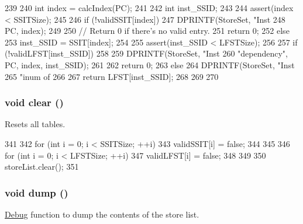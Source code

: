 \begin{DoxyCode}
239 {
240     int index = calcIndex(PC);
241 
242     int inst_SSID;
243 
244     assert(index < SSITSize);
245 
246     if (!validSSIT[index]) {
247         DPRINTF(StoreSet, "Inst %
248                 PC, index);
249 
250         // Return 0 if there's no valid entry.
251         return 0;
252     } else {
253         inst_SSID = SSIT[index];
254 
255         assert(inst_SSID < LFSTSize);
256 
257         if (!validLFST[inst_SSID]) {
258 
259             DPRINTF(StoreSet, "Inst %
260                     "dependency\n", PC, index, inst_SSID);
261 
262             return 0;
263         } else {
264             DPRINTF(StoreSet, "Inst %
265                     "inum of %
266 
267             return LFST[inst_SSID];
268         }
269     }
270 }
\end{DoxyCode}
\hypertarget{classStoreSet_ac8bb3912a3ce86b15842e79d0b421204}{
\subsubsection[{clear}]{\setlength{\rightskip}{0pt plus 5cm}void clear ()}}
\label{classStoreSet_ac8bb3912a3ce86b15842e79d0b421204}
Resets all tables. 


\begin{DoxyCode}
341 {
342     for (int i = 0; i < SSITSize; ++i) {
343         validSSIT[i] = false;
344     }
345 
346     for (int i = 0; i < LFSTSize; ++i) {
347         validLFST[i] = false;
348     }
349 
350     storeList.clear();
351 }
\end{DoxyCode}
\hypertarget{classStoreSet_accd2600060dbaee3a3b41aed4034c63c}{
\subsubsection[{dump}]{\setlength{\rightskip}{0pt plus 5cm}void dump ()}}
\label{classStoreSet_accd2600060dbaee3a3b41aed4034c63c}
\hyperlink{namespaceDebug}{Debug} function to dump the contents of the store list. 


